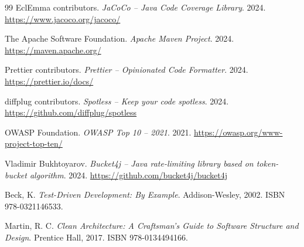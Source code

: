 \documentclass[12pt, a4paper]{report}
\begin{document}
\begin{thebibliography}{99}
    EclEmma contributors.
    \textit{JaCoCo -- Java Code Coverage Library}.
    2024.
    \url{https://www.jacoco.org/jacoco/}

    The Apache Software Foundation.
    \textit{Apache Maven Project}.
    2024.
    \url{https://maven.apache.org/}

    Prettier contributors.
    \textit{Prettier -- Opinionated Code Formatter}.
    2024.
    \url{https://prettier.io/docs/}

    diffplug contributors.
    \textit{Spotless -- Keep your code spotless}.
    2024.
    \url{https://github.com/diffplug/spotless}

    OWASP Foundation.
    \textit{OWASP Top 10 -- 2021}.
    2021.
    \url{https://owasp.org/www-project-top-ten/}

    Vladimir Bukhtoyarov.
    \textit{Bucket4j -- Java rate-limiting library based on token-bucket algorithm}.
    2024.
    \url{https://github.com/bucket4j/bucket4j}

    Beck, K.
    \textit{Test-Driven Development: By Example}.
    Addison-Wesley, 2002.
    ISBN 978-0321146533.

    Martin, R. C.
    \textit{Clean Architecture: A Craftsman's Guide to Software Structure and Design}.
    Prentice Hall, 2017.
    ISBN 978-0134494166.

\end{thebibliography}
\end{document}
